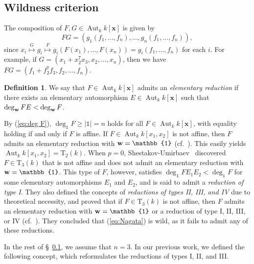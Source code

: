 \documentclass{amsart}
\theoremstyle{plain}
\theoremstyle{definition}
\newtheorem{definition}[thm]{Definition}
\newcommand{\Aut }{\mathop{\mathrm{Aut}}\nolimits}
\newcommand{\T }{\mathrm{T}}
\newcommand{\x}{{\boldsymbol x}}
\newcommand{\w}{{\bf w}}
\newcommand{\kx}{k[\x]}
\newcommand{\degww  }{\mathop{\rm deg}_{\w }\nolimits}
\begin{document}
\subsection{Wildness criterion}\label{subsetc:criterion}

The composition of $F,G\in \Aut _k\kx $ is given by 
$$
FG=(g_1(f_1,\ldots ,f_n),\ldots ,g_n(f_1,\ldots ,f_n)),
$$
since $x_i\stackrel{G}{\mapsto }
g_i\stackrel{F}{\mapsto }
g_i(F(x_1),\ldots ,F(x_n))=g_i(f_1,\ldots ,f_n)$ 
for each $i$. 
For example, 
if $G=(x_1+x_2^7x_3,x_2,\ldots ,x_n)$, 
then we have $FG=(f_1+f_2^7f_3,f_2,\ldots ,f_n)$. 


\begin{definition}\label{defn:ER}\rm
We say that $F\in \Aut _k\kx $ admits an 
{\it elementary reduction} 
if there exists an elementary automorphism $E\in \Aut _k\kx $ 
such that $\degww  FE<\degww  F$. 
\end{definition}


By (\ref{eq:deg F}), 
$\deg _{\mathbb{1}}F\ge |\mathbb{1}|=n$ 
holds for all $F\in \Aut _k\kx $, 
with equality holding if and only if $F$ is affine. 
If $F\in \Aut _kk[x_1,x_2]$ is not affine, 
then $F$ admits an elementary reduction 
with $\w =\mathbb{1}$ 
(cf.\ \cite[\S ~6.9]{Cohn}). 
This easily yields $\Aut _kk[x_1,x_2]=\T _2(k)$. 
When $p=0$, 
Shestakov-Umirbaev~\cite[Example 1]{SU} discovered $F\in \T _3(k)$ 
that is not affine 
and does not admit an elementary reduction with $\w =\mathbb{1}$. 
This type of $F$, however, 
satisfies $\deg_{\mathbb{1}}FE_1E_2<\deg_{\mathbb{1}}F$ 
for some elementary automorphisms $E_1$ and $E_2$, 
and is said to admit a {\it reduction of type I}. 
They also defined the concepts of 
{\it reductions of types II, III, and IV} 
due to theoretical necessity, 
and proved that if $F\in \T _3(k)$ is not affine, 
then $F$ admits an elementary reduction 
with $\w =\mathbb{1}$ 
or a reduction of type 
I, II, III, or IV (cf.~\cite[Theorem 1]{SU}). 
They concluded that (\ref{eq:Nagata}) is wild, 
as it fails to admit any of these reductions. 



In the rest of \S ~\ref{subsetc:criterion}, 
we assume that $n=3$. 
In our previous work, 
we defined the following concept, which reformulates 
the reductions of types I, II, and III. 
\end{document}
